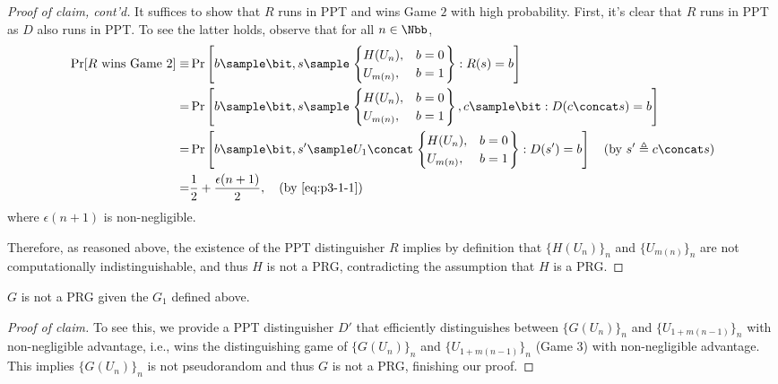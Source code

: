 \begin{answer}[i]
\begin{proof}[Proof of claim, cont'd]
    It suffices to show that $R$ runs in PPT and wins Game $2$ with high probability. First, it's clear that $R$ runs in PPT as $D$ also runs in PPT. To see the latter holds, observe that for all $n\in\Nbb$,
    \begin{align*}
        \Pr[R \textrm{ wins Game } 2]
        \equiv& \Pr\left[b\sample\bit, s\sample \left.\begin{cases} 
                H(U_{n}), &b = 0 \\
                U_{m(n)}, &b = 1 
            \end{cases}\right\} : R(s)=b \right] \\
        =& \Pr\left[b\sample\bit, s\sample \left.\begin{cases} 
                H(U_{n}), &b = 0 \\
                U_{m(n)}, &b = 1 
            \end{cases}\right\}, c\sample\bit : D(c\concat s)=b \right] \\
        =& \Pr\left[b\sample\bit, s'\sample U_1\concat \left.\begin{cases} 
                H(U_{n}), &b = 0 \\
                U_{m(n)}, &b = 1 
            \end{cases}\right\} : D(s')=b \right] \quad \textrm{(by $s'\triangleq c\concat s$)}\\
        =& \frac{1}{2}+\frac{\epsilon(n+1)}{2}, \quad \textrm{(by \eqref{eq:p3-1-1})}
    \end{align*}
    where $\epsilon(n+1)$ is non-negligible.

    Therefore, as reasoned above, the existence of the PPT distinguisher $R$ implies by definition that $\{H(U_n)\}_n$ and $\{U_{m(n)}\}_n$ are not computationally indistinguishable, and thus $H$ is not a PRG, contradicting the assumption that $H$ is a PRG.
\end{proof}


\begin{claim}\label{claim:p3-1-2}
    $G$ is not a PRG given the $G_1$ defined above.
\end{claim}
\begin{proof}[Proof of claim]
    To see this, we provide a PPT distinguisher $D'$ that efficiently distinguishes between $\{G(U_n)\}_n$ and $\{U_{1+m(n-1)}\}_n$ with non-negligible advantage, i.e., wins the distinguishing game of $\{G(U_n)\}_n$ and $\{U_{1+m(n-1)}\}_n$ (Game $3$) with non-negligible advantage. This implies $\{G(U_n)\}_n$ is not pseudorandom and thus $G$ is not a PRG, finishing our proof.
    

\end{proof}
\end{answer}
